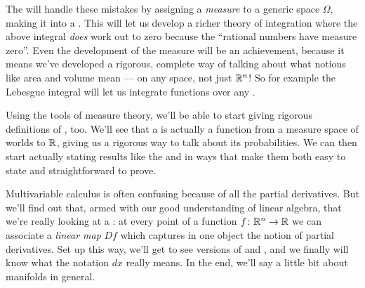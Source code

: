 \begin{itemize}
The  will handle these mistakes
by assigning a \emph{measure} to a generic space $\Omega$,
making it into a .
This will let us develop a richer theory of integration
where the above integral \emph{does} work out to zero
because the ``rational numbers have measure zero''.
Even the development of the measure will be an achievement,
because it means we've developed a rigorous, complete way
of talking about what notions like area and volume mean ---
on any space, not just $\mathbb R^n$!
So for example the Lebesgue integral will let us
integrate functions over any .

Using the tools of measure theory, we'll be able to start
giving rigorous definitions of , too.
We'll see that a  is actually
a function from a measure space of worlds to $\mathbb R$,
giving us a rigorous way to talk about its probabilities.
We can then start actually stating results like
the  and 
in ways that make them both easy to state and straightforward to prove.

Multivariable calculus is often confusing
because of all the partial derivatives.
But we'll find out that, armed with our good understanding
of linear algebra, that we're really looking at a :
at every point of a function $f \colon \mathbb R^n \to \mathbb R$
we can associate a \emph{linear map} $Df$ which
captures in one object the notion of partial derivatives.
Set up this way, we'll get to see versions of 
and ,
and we finally will know what the notation $dx$ really means.
In the end, we'll say a little bit about manifolds in general.
\end{itemize}

